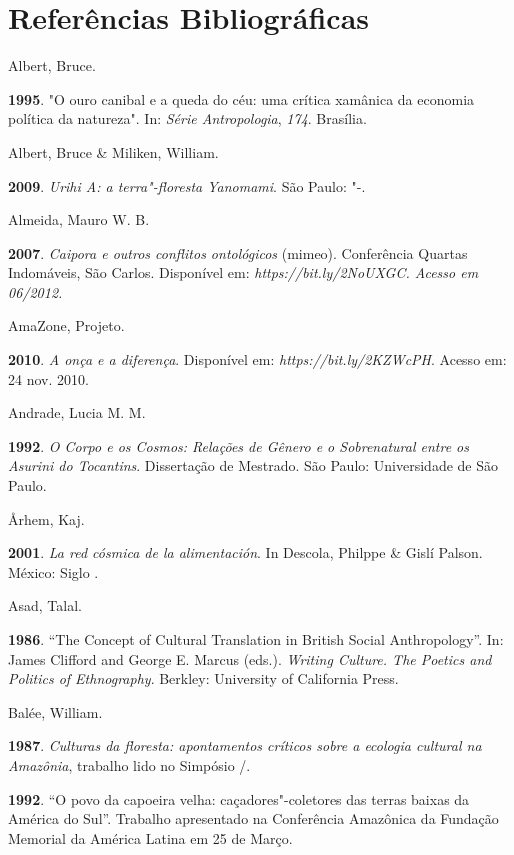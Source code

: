 
\chapter{Referências
Bibliográficas}\label{referuxeancias-bibliogruxe1ficas}

Albert, Bruce.

\textbf{1995}. "O ouro canibal e a queda do céu: uma crítica xamânica da
economia política da natureza". In: \emph{Série Antropologia},
\emph{174}. Brasília.

Albert, Bruce \& Miliken, William.

\textbf{2009}. \emph{Urihi A: a terra"-floresta Yanomami}. São Paulo:
"-.

Almeida, Mauro W. B.

\textbf{2007}. \emph{Caipora e outros conflitos ontológicos} (mimeo).
Conferência Quartas Indomáveis, São Carlos. Disponível em:
\emph{https://bit.ly/2NoUXGC. Acesso em 06/2012.}

AmaZone, Projeto.

\textbf{2010}. \emph{A onça e a diferença}. Disponível em:
\emph{https://bit.ly/2KZWcPH}.
Acesso em: 24 nov. 2010.

Andrade, Lucia M. M.

\textbf{1992}. \emph{O Corpo e os Cosmos: Relações de Gênero e o
Sobrenatural entre os Asurini do Tocantins}. Dissertação de Mestrado.
São Paulo: Universidade de São Paulo.

Århem, Kaj.

\textbf{2001}. \emph{La red cósmica de la alimentación}. In Descola,
Philppe \& Gislí Palson. México: Siglo .

Asad, Talal.

\textbf{1986}. ``The Concept of Cultural Translation in British Social
Anthropology''. In: James Clifford and George E. Marcus (eds.).
\emph{Writing Culture. The Poetics and Politics of Ethnography}.
Berkley: University of California Press.

Balée, William.

\textbf{1987}. \emph{Culturas da floresta: apontamentos críticos sobre a
ecologia cultural na Amazônia}, trabalho lido no Simpósio /.

\textbf{1992}. ``O povo da capoeira velha: caçadores"-coletores das
terras baixas da América do Sul''. Trabalho apresentado na Conferência
Amazônica da Fundação Memorial da América Latina em 25 de Março.

